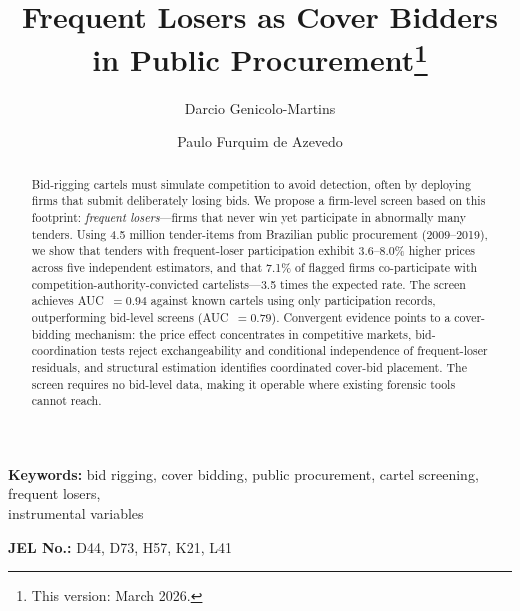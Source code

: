 \begin{frontmatter}

\title{Frequent Losers as Cover Bidders in Public Procurement\texorpdfstring{\footnote{This version: March 2026.}}{}}

\author[insper]{Darcio Genicolo-Martins}
\author[insper]{Paulo Furquim de Azevedo}

\begin{abstract}
Bid-rigging cartels must simulate competition to avoid detection,
often by deploying firms that submit deliberately losing bids. We
propose a firm-level screen based on this footprint: \emph{frequent
losers}---firms that never win yet participate in abnormally many
tenders. Using 4.5 million tender-items from Brazilian public
procurement (2009--2019), we show that tenders with frequent-loser
participation exhibit 3.6--8.0\% higher prices across five
independent estimators, and that 7.1\% of flagged firms
co-participate with competition-authority-convicted cartelists---3.5
times the expected rate. The screen achieves AUC~$= 0.94$ against
known cartels using only participation records, outperforming
bid-level screens (AUC~$= 0.79$). Convergent evidence points to a
cover-bidding mechanism: the price effect concentrates in competitive
markets, bid-coordination tests reject exchangeability and
conditional independence of frequent-loser residuals, and structural
estimation identifies coordinated cover-bid placement. The screen
requires no bid-level data, making it operable where existing
forensic tools cannot reach.
\end{abstract}

\end{frontmatter}

\noindent\textbf{Keywords:} bid rigging, cover bidding, public procurement, cartel screening, frequent losers,\\ instrumental variables

\noindent\textbf{JEL No.:} D44, D73, H57, K21, L41

\bigskip
